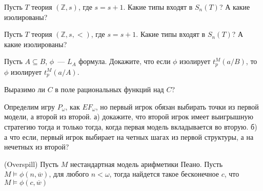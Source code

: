 \setcounter{curtask}{24}


\begin{task}
    Пусть $T$ теория $(\mathbb{Z}, s)$, где $s = s + 1$. Какие типы входят в
    $S_n(T)$? А какие изолированы?
\end{task}

\begin{task}
    Пусть $T$ теория $(\mathbb{Z}, s, <)$, где $s = s + 1$. Какие типы входят в
    $S_n(T)$? А какие изолированы?
\end{task}

\begin{task}
    Пусть $A \subseteq B$, $\phi$~--- $L_A$ формула. Докажите, что если $\phi$
    изолирует $t_p^M(a/B)$, то $\phi$ изолирует $t_p^M(a/A)$.
\end{task}

\breakline


\begin{ptask}{12}
    Выразимо ли $C$ в поле рациональных функций над $C$?
\end{ptask}

\begin{ptask}{17}
    Определим игру $P_{\omega}$, как $EF_{\omega}$, но первый игрок обязан выбирать
    точки из первой модели, а второй из второй.
	а) докажите, что второй игрок имеет выигрышную стратегию тогда и только тогда,
    когда первая модель вкладывается во вторую.
    б) а что если, первый игрок выбирает на четных шагах из первой структуры, а на
    нечетных из второй?
\end{ptask}

\begin{ptask}{19}(Overspill)
    Пусть $M$ нестандартная модель арифметики Пеано. Пусть
    $M \models \phi(n, \overline{w})$, для любого $n < \omega$, тогда найдется такое
    бесконечное $c$, что $M \models \phi(c, \overline{w})$
\end{ptask}

